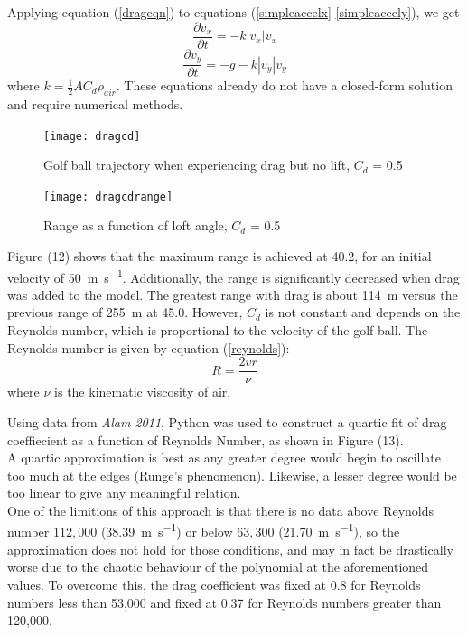 \documentclass[12pt]{article}
\begin{document}
Applying equation (\ref{drageqn}) to equations (\ref{simpleaccelx}-\ref{simpleaccely}), we get
\begin{equation} \label{dragaccelx}
\frac{\partial v_x}{\partial t}=-k |v_x| v_x
\end{equation}
\begin{equation} \label{dragaccely}
\frac{\partial v_y}{\partial t}=-g-k |v_y| v_y
\end{equation}
where $k=\frac{1}{2} A C_d \rho_{air}$. These equations already do not have a closed-form solution and require numerical methods.
\begin{figure}[H]
\centering
\caption{Golf ball trajectory when experiencing drag but no lift, $C_d$ = 0.5}
\texttt{[image: dragcd]}
\end{figure}

\begin{figure}[H]
\centering
\caption{Range as a function of loft angle, $C_d$ = 0.5}
\texttt{[image: dragcdrange]}
\end{figure}

Figure (12) shows that the maximum range is achieved at 40.2\degree, for an initial velocity of \SI{50}{\metre\per\second}. Additionally, the range is significantly decreased when drag was added to the model. The greatest range with drag is about \SI{114}{\metre} versus the previous range of \SI{255}{\metre} at 45.0\degree.
However, $C_d$ is not constant and depends on the Reynolds number, which is proportional to the velocity of the golf ball. The Reynolds number is given by equation (\ref{reynolds})\cite{Alam2011}:
\begin{equation} \label{reynolds}
R=\frac{2vr}{\nu}
\end{equation}
where $\nu$ is the kinematic viscosity of air.

Using data from \textit{Alam 2011}\cite{Alam2011}, Python was used to construct a quartic fit of drag coeffiecient as a function of Reynolds Number, as shown in Figure (13).\\
A quartic approximation is best as any greater degree would begin to oscillate too much at the edges (Runge's phenomenon). Likewise, a lesser degree would be too linear to give any meaningful relation.\\
One of the limitions of this approach is that there is no data above Reynolds number $112,000$ (\SI{38.39}{\meter\per\second}) or below $63,300$ (\SI{21.70}{\meter\per\second}), so the approximation does not hold for those conditions, and may in fact be drastically worse due to the chaotic behaviour of the polynomial at the aforementioned values. To overcome this, the drag coefficient was fixed at 0.8 for Reynolds numbers less than 53,000 and fixed at 0.37 for Reynolds numbers greater than 120,000.
\end{document}
